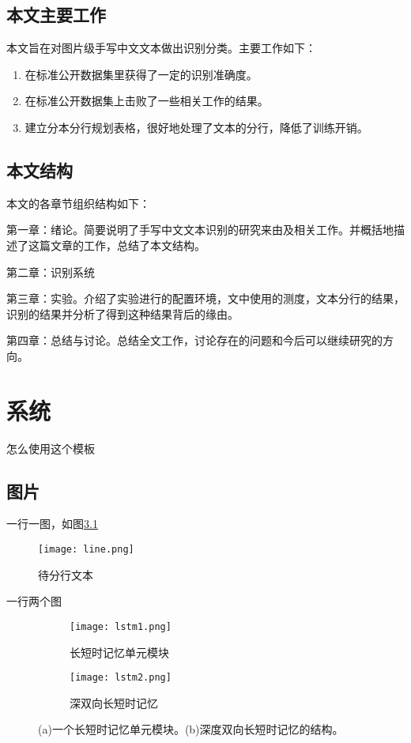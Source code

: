 \documentclass[winfonts]{njuthesis}
\begin{document}
\section{本文主要工作}
本文旨在对图片级手写中文文本做出识别分类。主要工作如下：
\begin{enumerate}
\item 在标准公开数据集里获得了一定的识别准确度。

\item 在标准公开数据集上击败了一些相关工作的结果。

\item 建立分本分行规划表格，很好地处理了文本的分行，降低了训练开销。

\end{enumerate}
\section{本文结构}
本文的各章节组织结构如下：

第一章：绪论。简要说明了手写中文文本识别的研究来由及相关工作。并概括地描述了这篇文章的工作，总结了本文结构。

第二章：识别系统

第三章：实验。介绍了实验进行的配置环境，文中使用的测度，文本分行的结果，识别的结果并分析了得到这种结果背后的缘由。

第四章：总结与讨论。总结全文工作，讨论存在的问题和今后可以继续研究的方向。

\chapter{系统}\label{chapter_system}

怎么使用这个模板

\section{图片}

一行一图，如图\ref{fig:line}
\begin{figure}[htbp]
   \centering
   \texttt{[image: line.png]} %
   \caption{待分行文本}
   \label{fig:line}
\end{figure}


一行两个图
\begin{figure}[ht!]
    \centering
    \begin{subfigure}{.5\textwidth}
    	\centering
        \texttt{[image: lstm1.png]}
        \caption{长短时记忆单元模块}
    \end{subfigure}
    \begin{subfigure}{.4\textwidth}
    	\centering
        \texttt{[image: lstm2.png]}
        \caption{深双向长短时记忆}
        \label{fig:lstm2}
    \end{subfigure}
    \caption{(a)一个长短时记忆单元模块。(b)深度双向长短时记忆的结构。}
\label{fig:lstm}
\end{figure}
\end{document}
